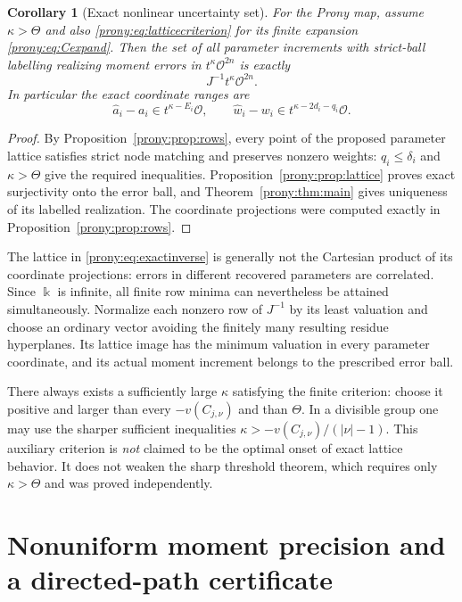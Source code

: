 \documentclass[11pt,letterpaper]{article}
\newtheorem{corollary}[theorem]{Corollary}
\theoremstyle{definition}
\theoremstyle{remark}
\newcommand{\Ocal}{\mathcal O}
\newcommand{\ah}{\widehat a}
\newcommand{\wh}{\widehat w}
\begin{document}
\begin{corollary}[Exact nonlinear uncertainty set]\label{prony:cor:nonlinear}
For the Prony map, assume $\kappa>\Theta$ and also
\eqref{prony:eq:latticecriterion} for its finite expansion \eqref{prony:eq:Cexpand}.
Then the set of all parameter increments with strict-ball labelling realizing moment errors
in $t^\kappa\Ocal^{2n}$ is exactly
\begin{equation}\label{prony:eq:exactinverse}
 J^{-1}t^\kappa\Ocal^{2n}.
\end{equation}
In particular the exact coordinate ranges are
\[
 \ah_i-a_i\in t^{\kappa-E_i}\Ocal,
 \qquad
 \wh_i-w_i\in t^{\kappa-2d_i-q_i}\Ocal.
\]
\end{corollary}
\begin{proof}
By Proposition~\ref{prony:prop:rows}, every point of the proposed parameter
lattice satisfies strict node matching and preserves nonzero weights:
$q_i\le \delta_i$ and $\kappa>\Theta$ give the required inequalities.
Proposition~\ref{prony:prop:lattice} proves exact surjectivity onto the error
ball, and Theorem~\ref{prony:thm:main} gives uniqueness of its labelled
realization. The coordinate projections were computed exactly in
Proposition~\ref{prony:prop:rows}.
\end{proof}

The lattice in \eqref{prony:eq:exactinverse} is generally not the Cartesian
product of its coordinate projections: errors in different recovered
parameters are correlated. Since $\Bbbk$ is infinite, all finite row minima
can nevertheless be attained simultaneously. Normalize each nonzero row
of $J^{-1}$ by its least valuation and choose an ordinary vector avoiding
the finitely many resulting residue hyperplanes. Its lattice image has
the minimum valuation in every parameter coordinate, and its actual moment
increment belongs to the prescribed error ball.

There always exists a sufficiently large $\kappa$ satisfying the finite
criterion: choose it positive and larger than every $-v(C_{j,\nu})$ and
than $\Theta$. In a divisible group one may use the sharper sufficient
inequalities
$\kappa>-v(C_{j,\nu})/(|\nu|-1)$.
This auxiliary criterion is \emph{not} claimed to be the optimal onset of
exact lattice behavior. It does not weaken the sharp threshold theorem,
which requires only $\kappa>\Theta$ and was proved independently.

\section{Nonuniform moment precision and a directed-path certificate}
\label{prony:sec:graph}
\end{document}
